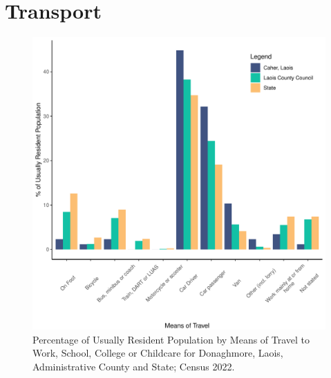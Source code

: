 \documentclass{article}
\begin{document}
\section{Transport}\label{sect:Trans}
\begin{figure}[H]
	\centering
	\includegraphics[width = 120mm]{../figures/TravelED.pdf}
	\caption{Percentage of Usually Resident Population by Means of Travel to Work, School, College or Childcare for Donaghmore, Laois, Administrative County and State; Census 2022.}
	\label{fig:vbnv}
	\end{figure}
\end{document}
